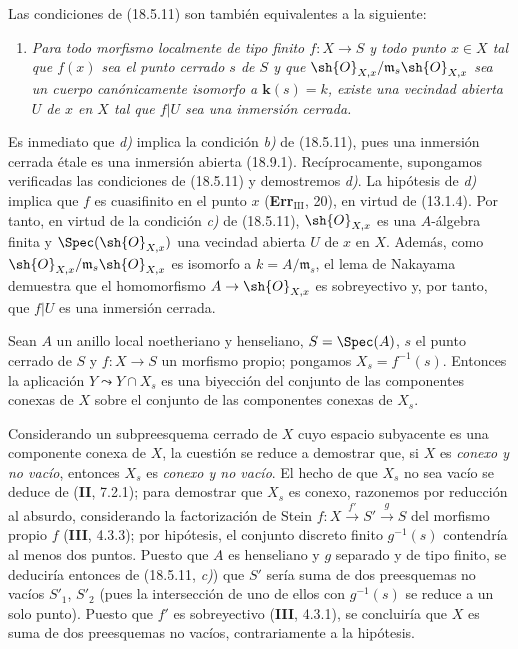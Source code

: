 \begin{remark}[18.5.18]
\label{IV.18.5.18}
Las condiciones de (18.5.11) son también equivalentes a la siguiente:
\begin{enumerate}
  \item[\textup{d)}] \itshape Para todo morfismo localmente de tipo finito $f:X\to S$ y todo punto $x\in X$ tal que $f(x)$ sea el punto cerrado $s$ de $S$ y que $\sh{O}_{X,x}/\mathfrak m_s\sh{O}_{X,x}$ sea un cuerpo canónicamente isomorfo a $\boldsymbol k(s)=k$, existe una vecindad abierta $U$ de $x$ en $X$ tal que $f|U$ sea una inmersión cerrada.
\end{enumerate}
\end{remark}


Es inmediato que \emph{d)} implica la condición \emph{b)} de (18.5.11), pues una inmersión cerrada étale es una inmersión abierta (18.9.1). Recíprocamente, supongamos verificadas las condiciones de (18.5.11) y demostremos \emph{d)}. La hipótesis de \emph{d)} implica que $f$ es cuasifinito en el punto $x$ (\textbf{Err}$_{\mathrm{III}}$, 20), en virtud de (13.1.4). Por tanto, en virtud de la condición \emph{c)} de (18.5.11), $\sh{O}_{X,x}$ es una $A$-álgebra finita y $\Spec(\sh{O}_{X,x})$ una vecindad abierta $U$ de $x$ en $X$. Además, como $\sh{O}_{X,x}/\mathfrak m_s\sh{O}_{X,x}$ es isomorfo a $k=A/\mathfrak m_s$, el lema de Nakayama demuestra que el homomorfismo $A\to\sh{O}_{X,x}$ es sobreyectivo y, por tanto, que $f|U$ es una inmersión cerrada.

\begin{proposition}[18.5.19]
\label{IV.18.5.19}
Sean $A$ un anillo local noetheriano y henseliano, $S=\Spec(A)$, $s$ el punto cerrado de $S$ y $f:X\to S$ un morfismo propio; pongamos $X_s=f^{-1}(s)$. Entonces la aplicación $Y\leadsto Y\cap X_s$ es una biyección del conjunto de las componentes conexas de $X$ sobre el conjunto de las componentes conexas de $X_s$.
\end{proposition}

Considerando un subpreesquema cerrado de $X$ cuyo espacio subyacente es una componente conexa de $X$, la cuestión se reduce a demostrar que, si $X$ es \emph{conexo y no vacío}, entonces $X_s$ es \emph{conexo y no vacío}. El hecho de que $X_s$ no sea vacío se deduce de (\textbf{II}, 7.2.1); para demostrar que $X_s$ es conexo, razonemos por reducción al absurdo, considerando la factorización de Stein $f:X\xrightarrow{f'}S'\xrightarrow{g}S$ del morfismo propio $f$ (\textbf{III}, 4.3.3); por hipótesis, el conjunto discreto finito $g^{-1}(s)$ contendría al menos dos puntos. Puesto que $A$ es henseliano y $g$ separado y de tipo finito, se deduciría entonces de (18.5.11, \emph{c)}) que $S'$ sería suma de dos preesquemas no vacíos $S'_1$, $S'_2$ (pues la intersección de uno de ellos con $g^{-1}(s)$ se reduce a un solo punto). Puesto que $f'$ es sobreyectivo (\textbf{III}, 4.3.1), se concluiría que $X$ es suma de dos preesquemas no vacíos, contrariamente a la hipótesis.
